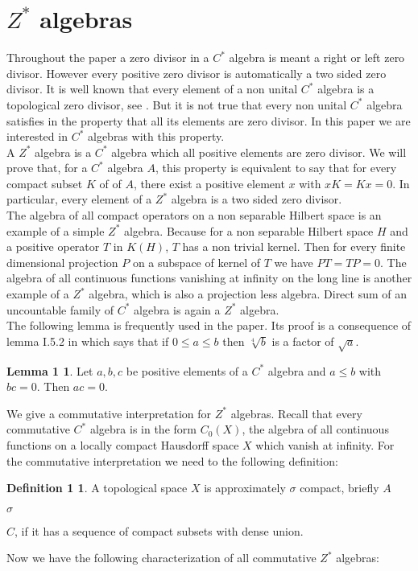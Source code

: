 \documentclass[a4paper,10pt]{amsart}
\theoremstyle{definition}
\newtheorem*{dfn1}{Definition     1}
\newtheorem*{lem1}{Lemma      1}
\theoremstyle{plain}
\begin{document}
\section*{$Z^{*}$  algebras}
  Throughout  the paper a zero divisor in  a  $C^{*}$  algebra is meant  a right or left zero divisor. However every positive zero divisor is automatically a two sided zero divisor. It is  well known that every  element of  a non unital $C^{*}$ algebra is a topological zero divisor, see \cite{BD}. But it is not true that every non unital  $C^{*}$  algebra  satisfies in the property that all its elements are zero divisor. In this  paper we are interested in $C^{*}$ algebras with this property.\\
  A  $Z^{*}$  algebra  is  a  $C^{*}$  algebra which all positive  elements are zero divisor.
 We will prove  that, for  a  $C^{*}$ algebra $A$, this property  is  equivalent to say that for every compact subset $K$ of of  $A$, there exist  a positive element $x$ with $xK=Kx=0$. In particular,  every element of  a  $Z^{*}$  algebra is  a two sided zero divisor.\\
  The algebra of all compact operators on a non separable  Hilbert space is  an example of  a simple  $Z^{*}$  algebra. Because for a non separable  Hilbert space $H$ and a positive operator $T$ in $K(H)$,   $T$ has  a non trivial kernel. Then for every finite dimensional projection $P$ on a subspace of kernel of $T$ we have $PT=TP=0$. The  algebra of all continuous  functions vanishing at infinity on the long line is  another  example of a $Z^{*}$  algebra, which is also a projection less algebra.
 Direct sum of an uncountable  family of $C^{*}$ algebra is  again  a $Z^{*}$ algebra.\\
The  following lemma  is frequently used in the paper. Its  proof is  a  consequence of lemma I.5.2 in \cite{DAVID} which says that if $0\leq a \leq b$ then  $\sqrt[4]{b}$ is  a factor of $\sqrt{a}$.
  \begin{lem1}
 Let $a,b,c$ be  positive elements of  a $C^{*}$  algebra and $a\leq b$  with $bc=0$. Then $ac=0$.
 \end{lem1}
 We give a  commutative  interpretation for $Z^{*}$ algebras. Recall that every commutative $C^{*}$  algebra is in the  form $C_{0}(X)$, the  algebra of  all continuous functions on a locally compact  Hausdorff space $X$ which vanish at infinity. For the  commutative  interpretation we need to the  following  definition:

\begin{dfn1}
A topological  space $X$  is  approximately $\sigma$ compact, briefly $A$\begin{Large}${\sigma}$\end{Large}$C$, if  it has a sequence of  compact  subsets with dense union.
\end{dfn1}
Now we have the  following  characterization of  all  commutative $Z^{*}$  algebras:
\end{document}
